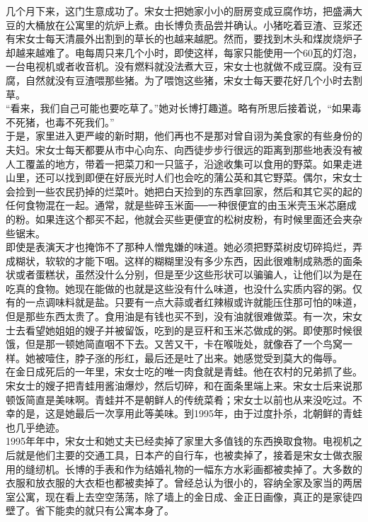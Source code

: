 几个月下来，这门生意成功了。宋女士把她家小小的厨房变成豆腐作坊，把盛满大豆的大桶放在公寓里的炕炉上煮。由长博负责品尝并确认。小猪吃着豆渣、豆浆还有宋女士每天清晨外出割到的草长的也越来越肥。然而，要找到木头和煤炭烧炉子却越来越难了。电每周只来几个小时，即使这样，每家只能使用一个60瓦的灯泡，一台电视机或者收音机。没有燃料就没法煮大豆，宋女士也就做不成豆腐。没有豆腐，自然就没有豆渣喂那些猪。为了喂饱这些猪，宋女士每天要花好几个小时去割草。\\

“看来，我们自己可能也要吃草了。”她对长博打趣道。略有所思后接着说，“如果毒不死猪，也毒不死我们。”\\

于是，家里进入更严峻的新时期，他们再也不是那对曾自诩为美食家的有些身份的夫妇。宋女士每天都要从市中心向东、向西徒步步行很远的距离到那些地表没有被人工覆盖的地方，带着一把菜刀和一只篮子，沿途收集可以食用的野菜。如果走进山里，还可以找到即便在好辰光时人们也会吃的蒲公英和其它野菜。偶尔，宋女士会捡到一些农民扔掉的烂菜叶。她把白天捡到的东西拿回家，然后和其它买的起的任何食物混在一起。通常，就是些碎玉米面──一种很便宜的由玉米壳玉米芯磨成的粉。如果连这个都买不起，他就会买些更便宜的松树皮粉，有时候里面还会夹杂些锯末。\\

即使是表演天才也掩饰不了那种人憎鬼嫌的味道。她必须把野菜树皮切碎捣烂，弄成糊状，软软的才能下咽。这样的糊糊里没有多少东西，因此很难制成熟悉的面条状或者蛋糕状，虽然没什么分别，但是至少这些形状可以骗骗人，让他们以为是在吃真的食物。她现在能做的也就是这些没有什么味道，也没什么实质内容的粥。仅有的一点调味料就是盐。只要有一点大蒜或者红辣椒或许就能压住那可怕的味道，但是那些东西太贵了。食用油是有钱也买不到，没有油就很难做菜。有一次，宋女士去看望她姐姐的嫂子并被留饭，吃到的是豆秆和玉米芯做成的粥。即使那时候很饿，但是那一顿她简直咽不下去。又苦又干，卡在喉咙处，就像吞了一个鸟窝一样。她被噎住，脖子涨的彤红，最后还是吐了出来。她感觉受到莫大的侮辱。\\

在金日成死后的一年里，宋女士吃的唯一肉食就是青蛙。他在农村的兄弟抓了些。宋女士的嫂子把青蛙用酱油爆炒，然后切碎，和在面条里端上来。宋女士后来说那顿饭简直是美味啊。青蛙并不是朝鲜人的传统菜肴；宋女士以前也从来没吃过。不幸的是，这是她最后一次享用此等美味。到1995年，由于过度扑杀，北朝鲜的青蛙也几乎绝迹。\\

1995年年中，宋女士和她丈夫已经卖掉了家里大多值钱的东西换取食物。电视机之后就是他们主要的交通工具，日本产的自行车，也被卖掉了，接着是宋女士做衣服用的缝纫机。长博的手表和作为结婚礼物的一幅东方水彩画都被卖掉了。大多数的衣服和放衣服的大衣柜也都被卖掉了。曾经总认为很小的，容纳全家及家当的两居室公寓，现在看上去空空荡荡，除了墙上的金日成、金正日画像，真正的是家徒四壁了。省下能卖的就只有公寓本身了。\\

